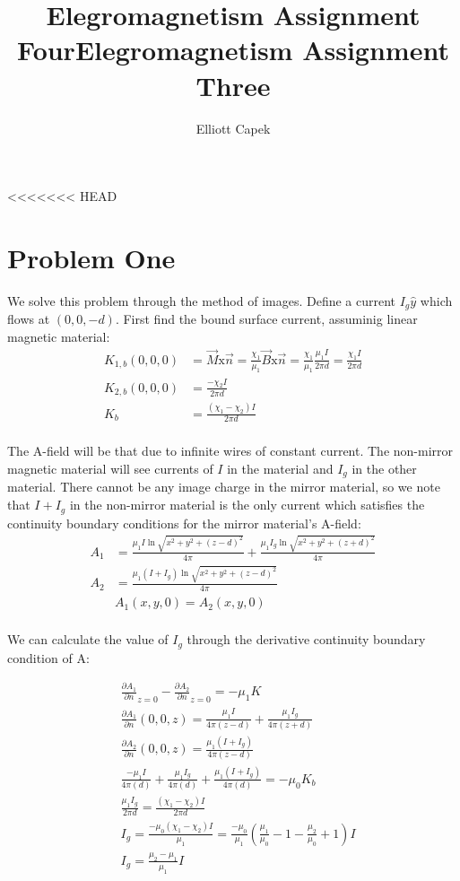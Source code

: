 \documentclass[10pt]{article} %
\title{Elegromagnetism Assignment Four}
\title{Elegromagnetism Assignment Three}
\author{Elliott Capek}
\begin{document}
\maketitle{}

<<<<<<< HEAD
\section{Problem One}
We solve this problem through the method of images. Define a current $I_g\hat{y}$ which flows at $(0,0,-d)$. First find the bound surface current, assuminig linear magnetic material:\\

\begin{align*}
  K_{1,b}(0,0,0) &= \vec{M} \mbox{x} \vec{n} = \frac{\chi_1}{\mu_1}\vec{B} \mbox{x} \vec{n} = \frac{\chi_1}{\mu_1}\frac{\mu_1I}{2\pi d} = \frac{\chi_1I}{2\pi d}\\
  K_{2,b}(0,0,0) &= \frac{-\chi_2I}{2\pi d}\\
  K_{b} &= \frac{(\chi_1-\chi_2)I}{2\pi d}\\
\end{align*}

The A-field will be that due to infinite wires of constant current. The non-mirror magnetic material will see currents of $I$ in the material and $I_g$ in the other material. There cannot be any image charge in the mirror material, so we note that $I+I_g$ in the non-mirror material is the only current which satisfies the continuity boundary conditions for the mirror material's A-field:\\

\begin{align*}
  A_1 &= \frac{\mu_1I\ln{\sqrt{x^2+y^2+(z-d)^2}}}{4\pi} + \frac{\mu_1I_g\ln{\sqrt{x^2+y^2+(z+d)^2}}}{4\pi}\\
  A_2 &= \frac{\mu_1(I+I_g)\ln{\sqrt{x^2+y^2+(z-d)^2}}}{4\pi}\\
  &A_1(x,y,0) = A_2(x,y,0)\\
\end{align*}

We can calculate the value of $I_g$ through the derivative continuity boundary condition of A:

\begin{align*}
  &\frac{\partial A_1}{\partial n}_{z=0} - \frac{\partial A_2}{\partial n}_{z=0} = -\mu_1 K\\
  &\frac{\partial A_1}{\partial n}(0,0,z) = \frac{\mu_1I}{4\pi(z-d)} + \frac{\mu_1I_g}{4\pi(z+d)}\\
  &\frac{\partial A_2}{\partial n}(0,0,z) = \frac{\mu_1(I+I_g)}{4\pi(z-d)}\\
  &\frac{-\mu_1I}{4\pi(d)} + \frac{\mu_1I_g}{4\pi(d)} + \frac{\mu_1(I+I_g)}{4\pi(d)} = -\mu_0K_b\\
  &\frac{\mu_1I_g}{2\pi d} = \frac{(\chi_1-\chi_2)I}{2\pi d}\\
  &I_g = \frac{-\mu_0(\chi_1-\chi_2)I}{\mu_1} = \frac{-\mu_0}{\mu_1}\left(\frac{\mu_1}{\mu_0}-1-\frac{\mu_2}{\mu_0}+1\right)I\\
  &I_g = \frac{\mu_2-\mu_1}{\mu_1}I\\
\end{align*}
\end{document}
